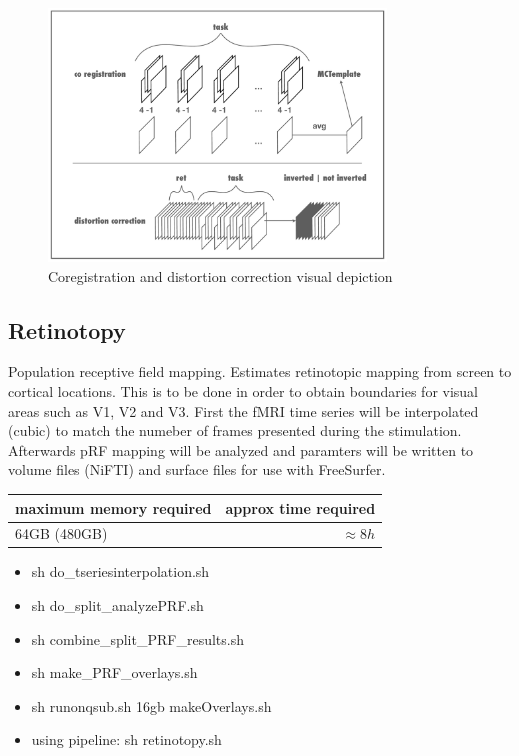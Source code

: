 \documentclass[12pt,a4paper]{scrartcl}
\begin{document}
\begin{figure}
\begin{center}
\includegraphics[width=0.8\textwidth]{coregdist}
\caption[Coregistration and distortion correction visual depiction]{Coregistration and distortion correction visual depiction}
\end{center}
\end{figure}

\subsection{Retinotopy}
Population receptive field mapping. Estimates retinotopic mapping from screen to cortical locations. This is to be done in order to obtain boundaries for visual areas such as V1, V2 and V3. First the fMRI time series will be interpolated (cubic) to match the numeber of frames presented during the stimulation. Afterwards pRF mapping will be analyzed and paramters will be written to volume files (NiFTI) and surface files for use with FreeSurfer.
\begin{table}[h]
\begin{tabular}{l | r}
\toprule
maximum memory required & approx time required\\\toprule
64GB (480GB) & $\approx 8h$ \\\bottomrule
\end{tabular}
\end{table}
\begin{itemize}
\item sh do\_tseriesinterpolation.sh
\item sh do\_split\_analyzePRF.sh
\item sh combine\_split\_PRF\_results.sh
\item sh make\_PRF\_overlays.sh
\item sh runonqsub.sh 16gb makeOverlays.sh
\item using pipeline: sh retinotopy.sh
\end{itemize}
\end{document}
